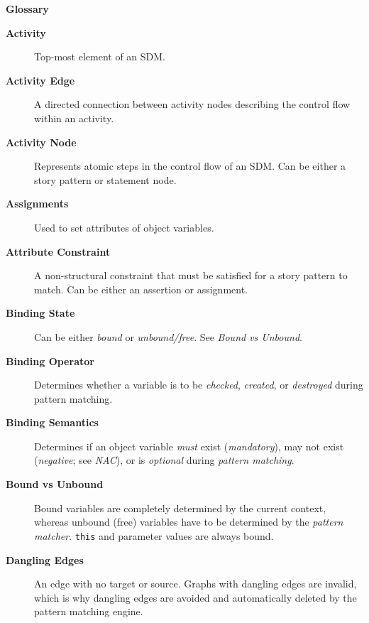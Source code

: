 \newpage
{}
{}
\hypertarget{glossary}{}

\vspace{1cm}
{\Huge \bf Glossary}
\vspace{1cm}

\begin{description}

\item[\bf Activity]
Top-most element of an SDM.

\item[\bf Activity Edge]
A directed connection between activity nodes describing the control flow within an activity.

\item[\bf Activity Node]
Represents atomic steps in the control flow of an SDM. Can be either a story pattern or statement node.

\item[\bf Assignments]
Used to set attributes of object variables.

\item[\bf Attribute Constraint]
A non-structural constraint that must be satisfied for a story pattern to match. Can be either an assertion or assignment.

\item[\bf Binding State]
Can be either \emph{bound} or \emph{unbound/free}. See \emph{Bound vs Unbound}.

\item[\bf Binding Operator]
Determines whether a variable is to be \emph{checked}, \emph{created}, or \emph{destroyed} during pattern matching.

\item[\bf Binding Semantics]
Determines if an object variable \emph{must} exist (\emph{mandatory}), may not exist (\emph{negative}; see \emph{NAC}), or is \emph{optional} during
\emph{pattern matching}.

\item[\bf Bound vs Unbound]
Bound variables are completely determined by the current context, whereas unbound (free) variables have to be determined by the \emph{pattern matcher}.
\texttt{this} and parameter values are always bound.

\item[\bf Dangling Edges]
An edge with no target or source. Graphs with dangling edges are invalid, which is why dangling edges are avoided and automatically deleted by the pattern
matching engine.


\end{description}

